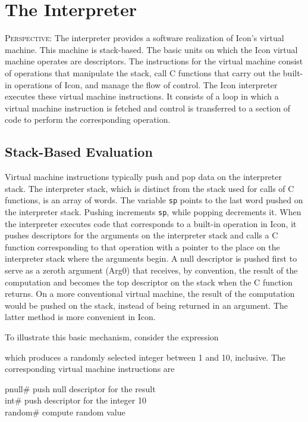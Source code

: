 \chapter{The Interpreter}
\label{IX-Chapter}

\textsc{Perspective}: The interpreter provides a software realization
of Icon's virtual machine. This machine is stack-based. The basic
units on which the Icon virtual machine operates are descriptors. The
instructions for the virtual machine consist of operations that
manipulate the stack, call C functions that carry out the built-in
operations of Icon, and manage the flow of control. The Icon
interpreter executes these virtual machine instructions.  It consists
of a loop in which a virtual machine instruction is fetched and
control is transferred to a section of code to perform the
corresponding operation.

\section{Stack-Based Evaluation}

Virtual machine instructions typically push and pop data on the
interpreter stack. The interpreter stack, which is distinct from the
stack used for calls of C functions, is an array of words. The
variable \texttt{sp} points to the last word pushed on the interpreter
stack. Pushing increments \texttt{sp}, while popping decrements it. When the
interpreter executes code that corresponds to a built-in operation in
Icon, it pushes descriptors for the arguments on the interpreter stack
and calls a C function corresponding to that operation with a pointer
to the place on the interpreter stack where the arguments begin. A
null descriptor is pushed first to serve as a
{\textquotedbl}zeroth{\textquotedbl} argument (Arg0) that receives, by
convention, the result of the computation and becomes the top
descriptor on the stack when the C function returns. On a more
conventional virtual machine, the result of the computation would be
pushed on the stack, instead of being returned in an argument. The
latter method is more convenient in Icon.

To illustrate this basic mechanism, consider the expression


\noindent which produces a randomly selected integer between 1 and 10,
inclusive. The corresponding virtual machine instructions are

\begin{iconcode}
\>pnull\>\>\>\>\>\>\# push null descriptor for the result\\
\>int\>\>\>\>\>\# push descriptor for the integer 10\\
\>random\>\>\>\>\>\>\# compute random value
\end{iconcode}


